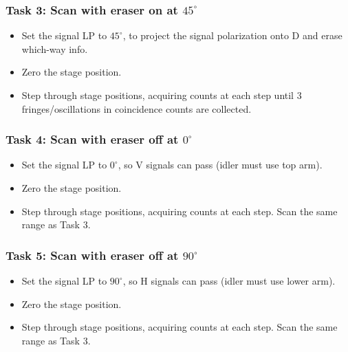 \documentclass{article}
\begin{document}
\subsubsection*{Task 3: Scan with eraser on at $45^\circ$}

\begin{itemize}
\item Set the signal LP to $45^\circ$, to project the signal polarization onto D and erase which-way info.
\item Zero the stage position.
\item Step through stage positions, acquiring counts at each step until 3 fringes/oscillations in coincidence counts are collected.
\end{itemize}

\subsubsection*{Task 4: Scan with eraser off at $0^\circ$}

\begin{itemize}
\item Set the signal LP to $0^\circ$, so V signals can pass (idler must use top arm).
\item Zero the stage position.
\item Step through stage positions, acquiring counts at each step. Scan the same range as Task 3.
\end{itemize}

\subsubsection*{Task 5: Scan with eraser off at $90^\circ$}

\begin{itemize}
\item Set the signal LP to $90^\circ$, so H signals can pass (idler must use lower arm).
\item Zero the stage position.
\item Step through stage positions, acquiring counts at each step. Scan the same range as Task 3.
\end{itemize}
\end{document}

